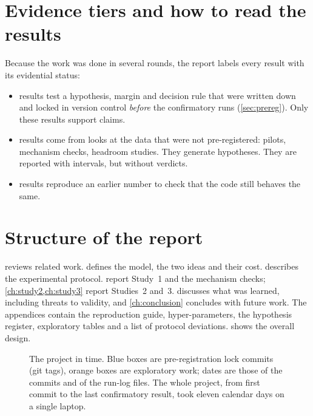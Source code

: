 \section{Evidence tiers and how to read the results}
Because the work was done in several rounds, the report labels every result with its evidential status:
\begin{itemize}
\item \tierC{} results test a hypothesis, margin and decision rule that were written down and locked in version control \emph{before} the confirmatory runs (\cref{sec:prereg}). Only these results support claims.
\item \tierE{} results come from looks at the data that were not pre-registered: pilots, mechanism checks, headroom studies. They generate hypotheses. They are reported with intervals, but without verdicts.
\item \tierV{} results reproduce an earlier number to check that the code still behaves the same.
\end{itemize}

\section{Structure of the report}
 reviews related work.  defines the model, the two ideas and their cost.  describes the experimental protocol.  report Study~1 and the mechanism checks; \cref{ch:study2,ch:study3} report Studies~2 and~3.  discusses what was learned, including threats to validity, and \cref{ch:conclusion} concludes with future work. The appendices contain the reproduction guide, hyper-parameters, the hypothesis register, exploratory tables and a list of protocol deviations.  shows the overall design.

\begin{figure}[t]
\centering
\resizebox{\textwidth}{!}{}
\caption{The project in time. Blue boxes are pre-registration lock commits (git tags), orange boxes are exploratory work; dates are those of the commits and of the run-log files. The whole project, from first commit to the last confirmatory result, took eleven calendar days on a single laptop.}
\label{fig:overview}
\end{figure}
